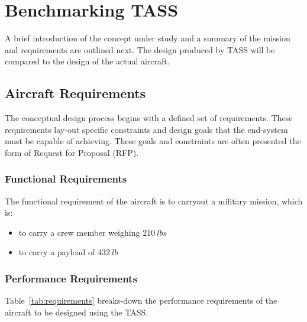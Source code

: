 \documentclass[pdftex,11pt,letter]{article}
\begin{document}
\section{Benchmarking TASS}
A brief introduction of the concept under study and a summary of the mission and requirements are  outlined next\cite{MavrisNotes}. The design produced by TASS will be compared to the design of the actual aircraft.

\subsection{Aircraft Requirements}\label{requirements}
 The conceptual design process begins with a defined set of requirements. These requirements lay-out specific constraints and design goals that the end-system must be capable of achieving.  These goals and constraints are often presented the form of Request for Proposal (RFP). %

\subsubsection{Functional Requirements}
The functional requirement of the aircraft is to carryout a military mission, which is:
\begin{itemize}
\item to carry a crew member weighing  $210~lbs$ 
\item to carry a payload of $432~lb$
\end{itemize}

\subsubsection{Performance Requirements}
Table~\ref{tab:requirements} breaks-down the performance requirements of the aircraft to be designed using the TASS. 
\end{document}
